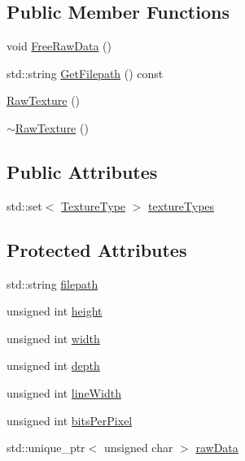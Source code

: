 \subsection*{Public Member Functions}
\begin{DoxyCompactItemize}
\item 
void \hyperlink{class_raw_texture_abc0bd100ec01cb31fd21dffb4a9dcab3}{Free\+Raw\+Data} ()
\item 
std\+::string \hyperlink{class_raw_texture_a481b8bb91a2218f802ad45ac9e9d9f77}{Get\+Filepath} () const 
\item 
\hyperlink{class_raw_texture_aaf66d9b0d654b8a2ddb02341aa660c52}{Raw\+Texture} ()
\item 
\hyperlink{class_raw_texture_a7d8603a772731a706575d2a4e42aca89}{$\sim$\+Raw\+Texture} ()
\end{DoxyCompactItemize}
\subsection*{Public Attributes}
\begin{DoxyCompactItemize}
\item 
std\+::set$<$ \hyperlink{class_raw_texture_ac0eafe7206f7f38aeb4e8e5631480f6d}{Texture\+Type} $>$ \hyperlink{class_raw_texture_a41f22696466ec5f4996f0f4dccc7e5e0}{texture\+Types}
\end{DoxyCompactItemize}
\subsection*{Protected Attributes}
\begin{DoxyCompactItemize}
\item 
std\+::string \hyperlink{class_raw_texture_a0f5f0ecaf7fd35c4fba96462d760aa0b}{filepath}
\item 
unsigned int \hyperlink{class_raw_texture_ac5e37bde9f359cb9676891d8636e75d0}{height}
\item 
unsigned int \hyperlink{class_raw_texture_a8db9a3ed2c3851077b13b881db99232c}{width}
\item 
unsigned int \hyperlink{class_raw_texture_abfd4db2756cc368282a55b1a6f8fc566}{depth}
\item 
unsigned int \hyperlink{class_raw_texture_a2bdb867781ad732469c7d03d9ce46f55}{line\+Width}
\item 
unsigned int \hyperlink{class_raw_texture_a30328bee28779a85b47f25886f1a3ff2}{bits\+Per\+Pixel}
\item 
std\+::unique\+\_\+ptr$<$ unsigned char $>$ \hyperlink{class_raw_texture_abe931dadd2a4b5bdbe82ee31f87ae60c}{raw\+Data}
\end{DoxyCompactItemize}
